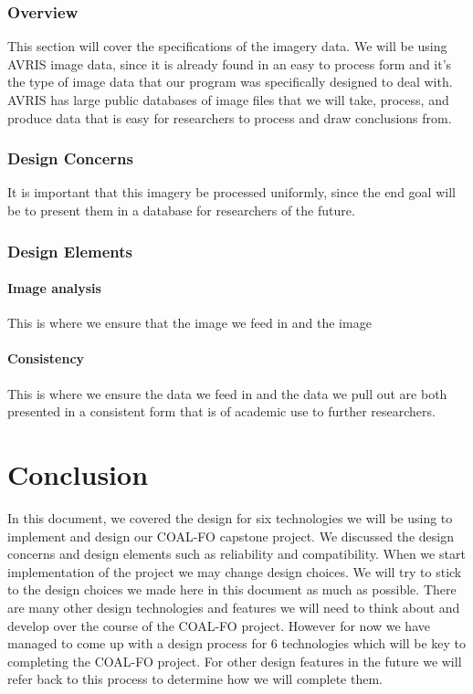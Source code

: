 \documentclass[10pt,draftclsnofoot,onecolumn,journal,compsoc]{IEEEtran}
\begin{document}
\subsubsection{Overview}
This section will cover the specifications of the imagery data. We will be using AVRIS image data, since it is already found in an easy to process form and it’s the type of image data that our program was specifically designed to deal with. AVRIS has large public databases of image files that we will take, process, and produce data that is easy for researchers to process and draw conclusions from.
\subsubsection{Design Concerns}
It is important that this imagery be processed uniformly, since the end goal will be to present them in a database for researchers of the future.
\subsubsection{Design Elements}
\paragraph{Image analysis}
This is where we ensure that the image we feed in and the image
\paragraph{Consistency}
This is where we ensure the data we feed in and the data we pull out are both presented in a consistent form that is of academic use to further researchers.

\section{Conclusion}

\noindent In this document, we covered the design for six technologies we will be using to implement and design our COAL-FO capstone project. We discussed the design concerns and design elements such as reliability and compatibility. When we start implementation of the project we may change design choices. We will try to stick to the design choices we made here in this document as much as possible. There are many other design technologies and features we will need to think about and develop over the course of the COAL-FO project. However for now we have managed to come up with a design process for 6 technologies which will be key to completing the COAL-FO project. For other design features in the future we will refer back to this process to determine how we will complete them.
\end{document}
